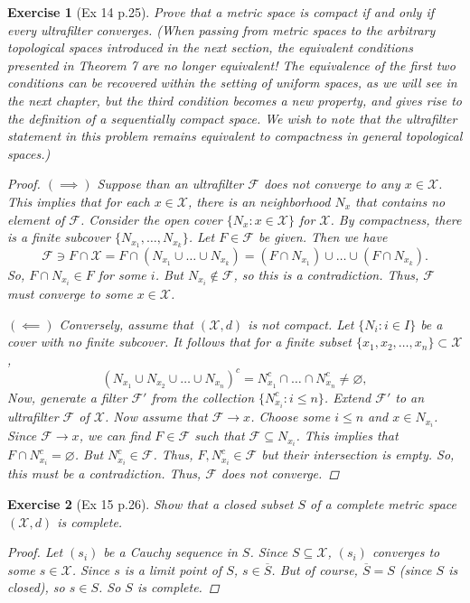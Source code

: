 \documentclass[11pt]{article}
\newtheorem{exercise}{Exercise}
\newcommand{\F}{\mathcal{F}}
\newcommand{\X}{\mathcal{X}}
\newcommand{\lp}{\left(}
\newcommand{\rp}{\right)}
\begin{document}
\begin{exercise}[Ex 14 p.25]
	Prove that a metric space is compact if and only if every ultrafilter converges.
	(When passing from metric spaces to the arbitrary topological spaces introduced in the next section, the equivalent conditions presented in Theorem 7 are no longer equivalent! The equivalence of the first two conditions can be recovered within the setting of uniform spaces, as we will see in the next chapter, but the third condition becomes a new property, and gives rise to the definition of a \textit{sequentially compact} space. We wish to note that the ultrafilter statement in this problem remains equivalent to compactness in general topological spaces.)
	\begin{proof}
		$(\implies)$ Suppose than an ultrafilter $\F$ does not converge to any $x\in \X$. This implies that for each $x\in \X$, there is an neighborhood $N_x$ that contains no element of $\F$. Consider the open cover $\{ N_x : x\in \X \}$ for $\X$. By compactness, there is a finite subcover $\{ N_{x_1},\dots, N_{x_k} \}$. Let $F\in \F$ be given. Then we have
		\begin{equation*}
		\F \ni F\cap \X = F \cap \lp N_{x_1} \cup \dots \cup N_{x_k} \rp = (F \cap N_{x_1}) \cup \dots \cup (F\cap N_{x_k}) .
		\end{equation*}
		So, $F\cap N_{x_i} \in F$ for some $i$. But $N_{x_i} \not\in \F$, so this is a contradiction. Thus, $\F$ must converge to some $x\in \X$.
		
		$(\impliedby)$ Conversely, assume that $(\X,d)$ is not compact. Let $\{N_i : i\in I \}$ be a cover with no finite subcover. It follows that for a finite subset $\{ x_1,x_2,\dots, x_n\} \subset \X$, 
		\begin{equation*}
		(N_{x_1} \cup N_{x_2} \cup \dots \cup N_{x_n})^c = N_{x_1}^c \cap \dots \cap N_{x_n}^c \neq \varnothing,
		\end{equation*} 
		Now, generate a filter $\F'$ from the collection $\{ N_{x_i}^c : i \leq n \}$. Extend $\F'$ to an ultrafilter $\F$ of $\X$. Now assume that $\F \to x$. Choose some $i\leq n$ and $x\in N_{x_i}$. Since $\F \to x$, we can find $F \in \F$ such that $\F \subseteq N_{x_i}$. This implies that $F \cap N_{x_i}^c = \varnothing$. But $N_{x_i}^c \in \F$. Thus, $F, N_{x_i}^c \in \F$ but their intersection is empty. So, this must be a contradiction. Thus, $\F$ does not converge. 
	\end{proof}
\end{exercise}

\begin{exercise}[Ex 15 p.26]
	Show that a closed subset $S$ of a complete metric space $(\X,d)$ is complete.
	\begin{proof}
		Let $(s_i)$ be a Cauchy sequence in $S$. Since $S\subseteq \X$, $(s_i)$ converges to some $s\in \X$. Since $s$ is a limit point of $S$, $s\in \overline{S}$. But of course, $\overline{S} =S$ (since $S$ is closed), so $s\in S$. So $S$ is complete. 
	\end{proof}
\end{exercise}
\end{document}

